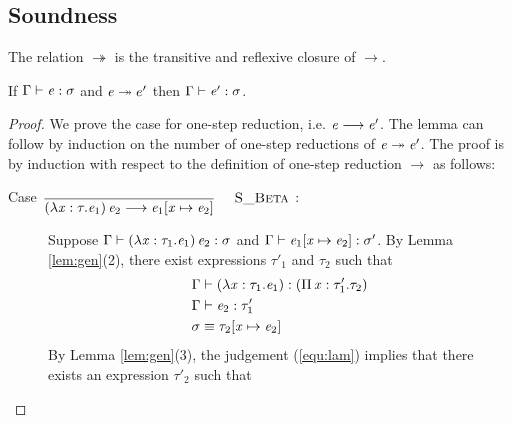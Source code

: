 \subsection{Soundness}
\begin{dfn}
    The relation $ \twoheadrightarrow $ is the transitive and reflexive closure of $ \longrightarrow $.
\end{dfn}

\begin{lem}
If $\Gamma  \vdash  \mathit{e}  :  \sigma$ and $\mathit{e}  \twoheadrightarrow  e'$ then $\Gamma  \vdash  \mathit{e'}  :  \sigma$.
\end{lem}

\begin{proof}
    We prove the case for one-step reduction, i.e. $\mathit{e}  \longrightarrow  \mathit{e'}$. The lemma can follow by induction on the number of one-step reductions of $\mathit{e}  \twoheadrightarrow  \mathit{e'}$.
    The proof is by induction with respect to the definition of one-step reduction $ \longrightarrow $ as follows:
    \begin{description}
        \item[Case ${\displaystyle\frac{\begin{array}{l} \end{array}}{ ( \lambda \mathit{x} : \tau . \mathit{e_{{\mathrm{1}}}} ) \, \mathit{e_{{\mathrm{2}}}} \longrightarrow \mathit{e_{{\mathrm{1}}}} [ \mathit{x} \mapsto \mathit{e_{{\mathrm{2}}}} ]}\quad\textsc{ {\textsc{S\_Beta}}{} }}$:] $\quad$ \\
        Suppose $\Gamma  \vdash  (  \lambda  \mathit{x}  :  \tau_{{\mathrm{1}}}  .  \mathit{e_{{\mathrm{1}}}}  ) \, \mathit{e_{{\mathrm{2}}}}  :  \sigma$ and $\Gamma  \vdash  \mathit{e_{{\mathrm{1}}}}  [  \mathit{x}  \mapsto  \mathit{e_{{\mathrm{2}}}}  ]  :  \sigma'$. By Lemma \ref{lem:gen}(2), there exist expressions $\tau'_{{\mathrm{1}}}$ and $\tau_{{\mathrm{2}}}$ such that 
        \begin{align}
            &\Gamma  \vdash  (  \lambda  \mathit{x}  :  \tau_{{\mathrm{1}}}  .  \mathit{e_{{\mathrm{1}}}}  )  :  (  \Pi \, \mathit{x}  :  \tau'_{{\mathrm{1}}}  .  \tau_{{\mathrm{2}}}  ) \label{equ:lam} \\
            &\Gamma  \vdash  \mathit{e_{{\mathrm{2}}}}  :  \tau'_{{\mathrm{1}}} \nonumber \\
            &\sigma  \equiv  \tau_{{\mathrm{2}}}  [  \mathit{x}  \mapsto  \mathit{e_{{\mathrm{2}}}}  ] \nonumber
        \end{align}
        By Lemma \ref{lem:gen}(3), the judgement (\ref{equ:lam}) implies that there exists an expression $\tau'_{{\mathrm{2}}}$ such that

\end{description}
\end{proof}
